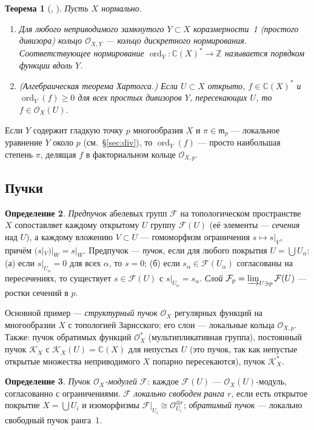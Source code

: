 \documentclass[11pt,a4paper]{article}
\theoremstyle{plain}
\newtheorem{theorem}{Теорема}[section]
\theoremstyle{definition}
\newtheorem{definition}[theorem]{Определение}
\theoremstyle{remark}
\renewcommand{\C}{\mathbb{C}}
\newcommand{\Z}{\mathbb{Z}}
\newcommand{\cO}{\mathcal{O}}
\newcommand{\cF}{\mathcal{F}}
\newcommand{\cK}{\mathcal{K}}
\newcommand{\mm}{\mathfrak{m}}
\DeclareMathOperator{\ord}{ord}
\begin{document}
\begin{theorem}[{\cite[I.6.2A, II.6.3A]{Ha}, \cite[II.5]{Sh}}]\label{thm:normal}
Пусть $X$ нормально.
\begin{enumerate}
\item Для любого неприводимого замкнутого $Y\subset X$ коразмерности~1 (\emph{простого дивизора})
кольцо $\cO_{X,Y}$ --- кольцо дискретного нормирования. Соответствующее нормирование
$\ord_Y\colon\C(X)^*\to\Z$ называется \emph{порядком} функции вдоль $Y$.
\item (\emph{Алгебраическая теорема Хартогса.}) Если $U\subset X$ открыто, $f\in\C(X)^*$ и
$\ord_Y(f)\ge0$ для всех простых дивизоров $Y$, пересекающих $U$, то $f\in\cO_X(U)$.
\end{enumerate}
\end{theorem}

Если $Y$ содержит гладкую точку $p$ многообразия $X$ и $\pi\in\mm_p$ --- локальное уравнение $Y$
около $p$ (см.~\S\ref{sec:div}), то $\ord_Y(f)$ --- просто наибольшая степень $\pi$, делящая $f$ в
факториальном кольце $\cO_{X,p}$.

\subsection{Пучки}\label{ss:sheaves}

\begin{definition}
\emph{Предпучок} абелевых групп $\cF$ на топологическом пространстве $X$ сопоставляет каждому
открытому $U$ группу $\cF(U)$ (её элементы --- \emph{сечения} над $U$), а каждому вложению
$V\subset U$ --- гомоморфизм ограничения $s\mapsto s|_V$, причём $(s|_V)|_W=s|_W$. Предпучок
--- \emph{пучок}, если для любого покрытия $U=\bigcup U_\alpha$:
(а) если $s|_{U_\alpha}=0$ для всех $\alpha$, то $s=0$; (б) если $s_\alpha\in\cF(U_\alpha)$
согласованы на пересечениях, то существует $s\in \cF(U)$ с $s|_{U_\alpha}=s_\alpha$.
\emph{Слой} $\cF_p=\varinjlim_{U\ni p}\cF(U)$ --- ростки сечений в $p$.
\end{definition}

Основной пример --- \emph{структурный пучок} $\cO_X$ регулярных функций на многообразии $X$
с топологией Зарисского; его слои --- локальные кольца $\cO_{X,p}$. Также: пучок обратимых функций
$\cO_X^*$ (мультипликативная группа), постоянный пучок $\cK_X$ с $\cK_X(U)=\C(X)$ для непустых $U$
(это пучок, так как непустые открытые множества неприводимого $X$ попарно пересекаются), пучок
$\cK_X^*$.

\begin{definition}
\emph{Пучок $\cO_X$-модулей} $\cF$: каждое $\cF(U)$ --- $\cO_X(U)$-модуль, согласованно с
ограничениями. $\cF$ \emph{локально свободен ранга $r$}, если есть открытое покрытие
$X=\bigcup U_i$ и изоморфизмы $\cF|_{U_i}\cong\cO_{U_i}^{\oplus r}$; \emph{обратимый пучок} ---
локально свободный пучок ранга~1.
\end{definition}
\end{document}
